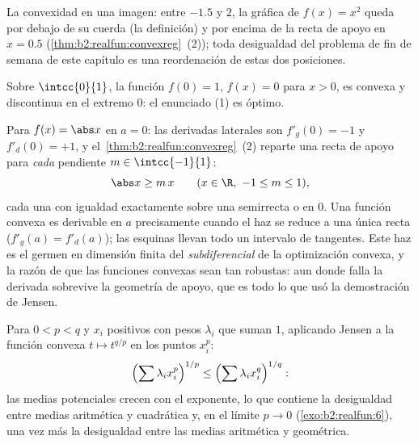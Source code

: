 \begin{omfigure}

{\small La convexidad en una imagen: entre $-1.5$ y $2$, la gráfica
de $f(x) = x^2$ queda por debajo de su cuerda (la definición) y por
encima de la recta de apoyo en $x = 0.5$
(\cref{thm:b2:realfun:convexreg}~(2)); toda desigualdad del problema
de fin de semana de este capítulo es una reordenación de estas dos
posiciones.}
\end{omfigure}

\begin{example}
Sobre $\intcc{0}{1}$, la función $f(0) = 1$, $f(x) = 0$ para $x >
0$, es convexa y discontinua en el extremo $0$: el enunciado (1) es
óptimo.
\end{example}

\begin{example}\label{ex:b2:realfun:corner}
Para $f(x) = \abs x$ en $a = 0$: las derivadas laterales son
$f'_g(0) = -1$ y $f'_d(0) = +1$, y el~\cref{thm:b2:realfun:convexreg}~(2) reparte una recta de apoyo para
\emph{cada} pendiente $m \in \intcc{-1}{1}$:
\[
\abs x \geq m\,x \qquad (x \in \R,\ -1 \leq m \leq 1),
\]
cada una con igualdad exactamente sobre una semirrecta o en $0$.
Una función convexa es derivable en $a$ precisamente cuando el haz
se reduce a una única recta ($f'_g(a) = f'_d(a)$); las esquinas
llevan todo un intervalo de tangentes. Este haz es el germen en
dimensión finita del \emph{subdiferencial} de la optimización
convexa, y la razón de que las funciones convexas sean tan robustas:
aun donde falla la derivada sobrevive la geometría de apoyo, que es
todo lo que usó la demostración de Jensen.
\end{example}

\begin{example}\label{ex:b2:realfun:powermeans}
Para $0 < p < q$ y $x_i$ positivos con pesos $\lambda_i$ que suman
$1$, aplicando Jensen a la función convexa $t \mapsto t^{q/p}$ en
los puntos $x_i^p$:
\[
\Bigl(\sum \lambda_i x_i^{p}\Bigr)^{1/p}
\leq \Bigl(\sum \lambda_i x_i^{q}\Bigr)^{1/q} :
\]
las medias potenciales crecen con el exponente, lo que contiene la
desigualdad entre medias aritmética y cuadrática y, en el límite $p
\to 0$ (\cref{exo:b2:realfun:6}), una vez más la desigualdad entre
las medias aritmética y geométrica.
\end{example}

